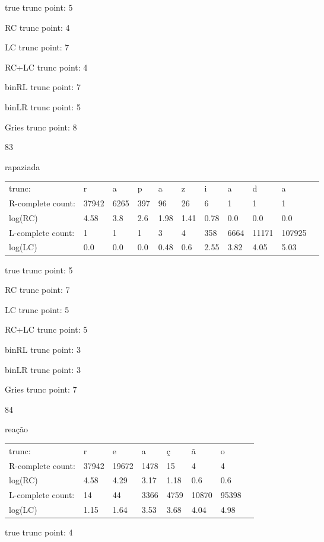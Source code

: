 \documentclass[10pt]{article}
\begin{document}
true trunc point: 5

RC trunc point: 4

LC trunc point: 7

RC+LC trunc point: 4

binRL trunc point: 7

binLR trunc point: 5

Gries trunc point: 8

\vspace{1em}

83

rapaziada

\begin{tabular}{l|llllllllll}
trunc: & r & a & p & a & z & i & a & d & a & \\ 
R-complete count: & 37942 & 6265 & 397 & 96 & 26 & 6 & 1 & 1 & 1 & \\ 
log(RC) & 4.58 & 3.8 & 2.6 & 1.98 & 1.41 & 0.78 & 0.0 & 0.0 & 0.0 & \\ 
L-complete count: & 1 & 1 & 1 & 3 & 4 & 358 & 6664 & 11171 & 107925 & \\ 
log(LC) & 0.0 & 0.0 & 0.0 & 0.48 & 0.6 & 2.55 & 3.82 & 4.05 & 5.03 & \\ 
\end{tabular}

true trunc point: 5

RC trunc point: 7

LC trunc point: 5

RC+LC trunc point: 5

binRL trunc point: 3

binLR trunc point: 3

Gries trunc point: 7

\vspace{1em}

84

reação

\begin{tabular}{l|lllllll}
trunc: & r & e & a & ç & ã & o & \\ 
R-complete count: & 37942 & 19672 & 1478 & 15 & 4 & 4 & \\ 
log(RC) & 4.58 & 4.29 & 3.17 & 1.18 & 0.6 & 0.6 & \\ 
L-complete count: & 14 & 44 & 3366 & 4759 & 10870 & 95398 & \\ 
log(LC) & 1.15 & 1.64 & 3.53 & 3.68 & 4.04 & 4.98 & \\ 
\end{tabular}

true trunc point: 4
\end{document}
